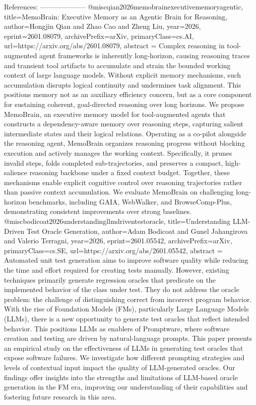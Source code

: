         References:
        --------------------
        @misc{qian2026memobrainexecutivememoryagentic,
      title={MemoBrain: Executive Memory as an Agentic Brain for Reasoning}, 
      author={Hongjin Qian and Zhao Cao and Zheng Liu},
      year={2026},
      eprint={2601.08079},
      archivePrefix={arXiv},
      primaryClass={cs.AI},
      url={https://arxiv.org/abs/2601.08079},
      abstract = {Complex reasoning in tool-augmented agent frameworks is inherently long-horizon, causing reasoning traces and transient tool artifacts to accumulate and strain the bounded working context of large language models. Without explicit memory mechanisms, such accumulation disrupts logical continuity and undermines task alignment. This positions memory not as an auxiliary efficiency concern, but as a core component for sustaining coherent, goal-directed reasoning over long horizons.   We propose MemoBrain, an executive memory model for tool-augmented agents that constructs a dependency-aware memory over reasoning steps, capturing salient intermediate states and their logical relations. Operating as a co-pilot alongside the reasoning agent, MemoBrain organizes reasoning progress without blocking execution and actively manages the working context. Specifically, it prunes invalid steps, folds completed sub-trajectories, and preserves a compact, high-salience reasoning backbone under a fixed context budget. Together, these mechanisms enable explicit cognitive control over reasoning trajectories rather than passive context accumulation.   We evaluate MemoBrain on challenging long-horizon benchmarks, including GAIA, WebWalker, and BrowseComp-Plus, demonstrating consistent improvements over strong baselines.}
}@misc{bodicoat2026understandingllmdriventestoracle,
      title={Understanding LLM-Driven Test Oracle Generation}, 
      author={Adam Bodicoat and Gunel Jahangirova and Valerio Terragni},
      year={2026},
      eprint={2601.05542},
      archivePrefix={arXiv},
      primaryClass={cs.SE},
      url={https://arxiv.org/abs/2601.05542},
      abstract = {Automated unit test generation aims to improve software quality while reducing the time and effort required for creating tests manually. However, existing techniques primarily generate regression oracles that predicate on the implemented behavior of the class under test. They do not address the oracle problem: the challenge of distinguishing correct from incorrect program behavior. With the rise of Foundation Models (FMs), particularly Large Language Models (LLMs), there is a new opportunity to generate test oracles that reflect intended behavior. This positions LLMs as enablers of Promptware, where software creation and testing are driven by natural-language prompts. This paper presents an empirical study on the effectiveness of LLMs in generating test oracles that expose software failures. We investigate how different prompting strategies and levels of contextual input impact the quality of LLM-generated oracles. Our findings offer insights into the strengths and limitations of LLM-based oracle generation in the FM era, improving our understanding of their capabilities and fostering future research in this area.}
}
